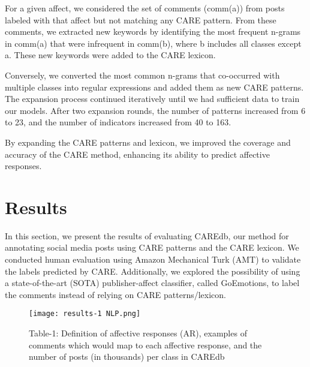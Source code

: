 \documentclass[conference]{IEEEtran}
\begin{document}
For a given affect, we considered the set of comments (comm(a)) from posts labeled with that affect but not matching any CARE pattern. From these comments, we extracted new keywords by identifying the most frequent n-grams in comm(a) that were infrequent in comm(b), where b includes all classes except a. These new keywords were added to the CARE lexicon.

Conversely, we converted the most common n-grams that co-occurred with multiple classes into regular expressions and added them as new CARE patterns. The expansion process continued iteratively until we had sufficient data to train our models. After two expansion rounds, the number of patterns increased from 6 to 23, and the number of indicators increased from 40 to 163.

By expanding the CARE patterns and lexicon, we improved the coverage and accuracy of the CARE method, enhancing its ability to predict affective responses.

\section{Results}
In this section, we present the results of evaluating CAREdb, our method for annotating social media posts using CARE patterns and the CARE lexicon. We conducted human evaluation using Amazon Mechanical Turk (AMT) to validate the labels predicted by CARE. Additionally, we explored the possibility of using a state-of-the-art (SOTA) publisher-affect classifier, called GoEmotions, to label the comments instead of relying on CARE patterns/lexicon.
\begin{figure}[h]
    \centering
    \texttt{[image: results-1 NLP.png]}
    \caption{Table-1: Definition of affective responses (AR), examples of comments which would map to each affective response,
and the number of posts (in thousands) per class in CAREdb}
    \label{fig:3}
\end{figure}
\end{document}
